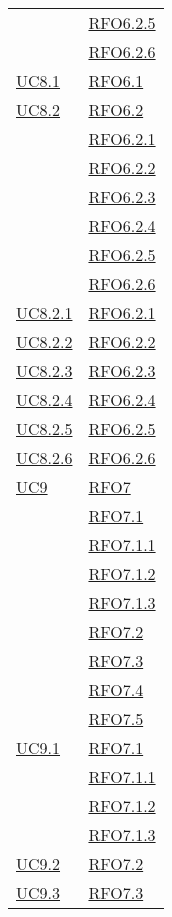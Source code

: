 \begin{longtable}{|>{\centering}m{5cm}|m{5cm}<{\centering}|}
& \hyperlink{RFO6.2.5}{RFO6.2.5}\\
& \hyperlink{RFO6.2.6}{RFO6.2.6}\\\hline
\hyperlink{UC8.1}{UC8.1} & \hyperlink{RFO6.1}{RFO6.1}\\\hline
\hyperlink{UC8.2}{UC8.2} & \hyperlink{RFO6.2}{RFO6.2}\\
& \hyperlink{RFO6.2.1}{RFO6.2.1}\\
& \hyperlink{RFO6.2.2}{RFO6.2.2}\\
& \hyperlink{RFO6.2.3}{RFO6.2.3}\\
& \hyperlink{RFO6.2.4}{RFO6.2.4}\\
& \hyperlink{RFO6.2.5}{RFO6.2.5}\\
& \hyperlink{RFO6.2.6}{RFO6.2.6}\\\hline
\hyperlink{UC8.2.1}{UC8.2.1} & \hyperlink{RFO6.2.1}{RFO6.2.1}\\\hline
\hyperlink{UC8.2.2}{UC8.2.2} & \hyperlink{RFO6.2.2}{RFO6.2.2}\\\hline
\hyperlink{UC8.2.3}{UC8.2.3} & \hyperlink{RFO6.2.3}{RFO6.2.3}\\\hline
\hyperlink{UC8.2.4}{UC8.2.4} & \hyperlink{RFO6.2.4}{RFO6.2.4}\\\hline
\hyperlink{UC8.2.5}{UC8.2.5} & \hyperlink{RFO6.2.5}{RFO6.2.5}\\\hline
\hyperlink{UC8.2.6}{UC8.2.6} & \hyperlink{RFO6.2.6}{RFO6.2.6}\\\hline
\hyperlink{UC9}{UC9} & \hyperlink{RFO7}{RFO7}\\
& \hyperlink{RFO7.1}{RFO7.1}\\
& \hyperlink{RFO7.1.1}{RFO7.1.1}\\
& \hyperlink{RFO7.1.2}{RFO7.1.2}\\
& \hyperlink{RFO7.1.3}{RFO7.1.3}\\
& \hyperlink{RFO7.2}{RFO7.2}\\
& \hyperlink{RFO7.3}{RFO7.3}\\
& \hyperlink{RFO7.4}{RFO7.4}\\
& \hyperlink{RFO7.5}{RFO7.5}\\\hline
\hyperlink{UC9.1}{UC9.1} & \hyperlink{RFO7.1}{RFO7.1}\\
& \hyperlink{RFO7.1.1}{RFO7.1.1}\\
& \hyperlink{RFO7.1.2}{RFO7.1.2}\\
& \hyperlink{RFO7.1.3}{RFO7.1.3}\\\hline
\hyperlink{UC9.2}{UC9.2} & \hyperlink{RFO7.2}{RFO7.2}\\\hline
\hyperlink{UC9.3}{UC9.3} & \hyperlink{RFO7.3}{RFO7.3}\\\hline

\end{longtable}
